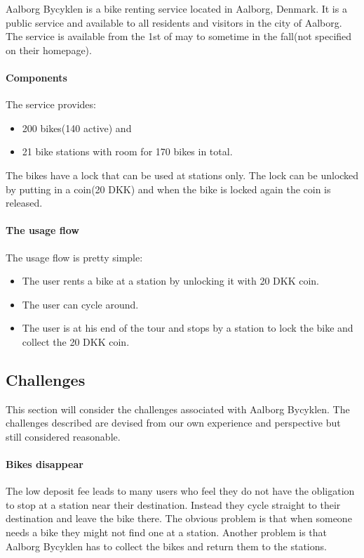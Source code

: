 \label{aalborg_bycyklen}
Aalborg Bycyklen is a bike renting service located in Aalborg, Denmark.
It is a public service and available to all residents and visitors in the city of Aalborg.
The service is available from the 1st of may to sometime in the fall(not specified on their homepage).\cite{aalborgbycyklenbagcyklen}


\paragraph{Components}
The service provides:
\begin{itemize}
\item 200 bikes(140 active) and 
\item 21 bike stations with room for 170 bikes in total.
\end{itemize}
The bikes have a lock that can be used at stations only.
The lock can be unlocked by putting in a coin(20 DKK) and when the bike is locked again the coin is released.

\paragraph{The usage flow}
The usage flow is pretty simple:
\begin{itemize}
\item The user rents a bike at a station by unlocking it with 20 DKK coin.
\item The user can cycle around.
\item The user is at his end of the tour and stops by a station to lock the bike and collect the 20 DKK coin.
\end{itemize}

\subsection{Challenges}\label{aalborg_bycyklen:challenges}
This section will consider the challenges associated with Aalborg Bycyklen.
The challenges described are devised from our own experience and perspective but still considered reasonable.

\paragraph{Bikes disappear}
The low deposit fee leads to many users who feel they do not have the obligation to stop at a station near their destination.
Instead they cycle straight to their destination and leave the bike there.
The obvious problem is that when someone needs a bike they might not find one at a station.
Another problem is that Aalborg Bycyklen has to collect the bikes and return them to the stations.

